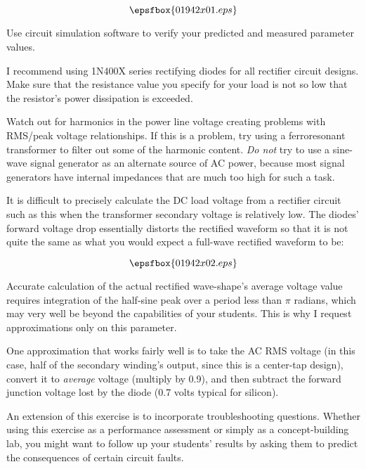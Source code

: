 

$$\epsfbox{01942x01.eps}$$

\vfil \eject






Use circuit simulation software to verify your predicted and measured parameter values.







I recommend using 1N400X series rectifying diodes for all rectifier circuit designs.  Make sure that the resistance value you specify for your load is not so low that the resistor's power dissipation is exceeded.  

Watch out for harmonics in the power line voltage creating problems with RMS/peak voltage relationships.  If this is a problem, try using a ferroresonant transformer to filter out some of the harmonic content.  {\it Do not} try to use a sine-wave signal generator as an alternate source of AC power, because most signal generators have internal impedances that are much too high for such a task.

It is difficult to precisely calculate the DC load voltage from a rectifier circuit such as this when the transformer secondary voltage is relatively low.  The diodes' forward voltage drop essentially distorts the rectified waveform so that it is not quite the same as what you would expect a full-wave rectified waveform to be:

$$\epsfbox{01942x02.eps}$$

Accurate calculation of the actual rectified wave-shape's average voltage value requires integration of the half-sine peak over a period less than $\pi$ radians, which may very well be beyond the capabilities of your students.  This is why I request approximations only on this parameter.

One approximation that works fairly well is to take the AC RMS voltage (in this case, half of the secondary winding's output, since this is a center-tap design), convert it to {\it average} voltage (multiply by 0.9), and then subtract the forward junction voltage lost by the diode (0.7 volts typical for silicon).

An extension of this exercise is to incorporate troubleshooting questions.  Whether using this exercise as a performance assessment or simply as a concept-building lab, you might want to follow up your students' results by asking them to predict the consequences of certain circuit faults.




